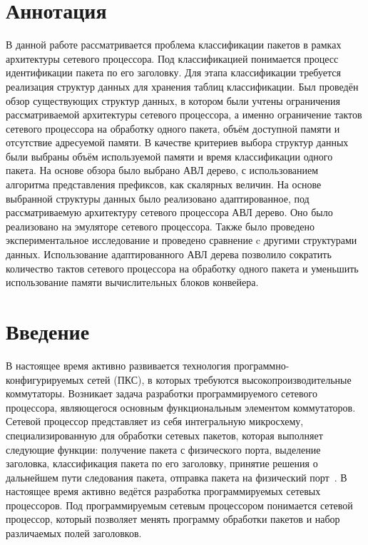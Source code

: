 \documentclass[a4paper, 12pt, titlepage, finall]{extreport}
\begin{document}
    \chapter*{Аннотация}
        В данной работе рассматривается проблема классификации пакетов в рамках архитектуры сетевого процессора. Под классификацией понимается процесс идентификации пакета по его заголовку.
        Для этапа классификации требуется реализация структур данных для хранения таблиц классификации.
        Был проведён обзор существующих структур данных, в котором были учтены ограничения рассматриваемой архитектуры сетевого процессора, а именно
        ограничение тактов сетевого процессора на обработку одного пакета, объём доступной памяти и отсутствие адресуемой памяти.
        В качестве критериев выбора структур данных были выбраны объём используемой памяти и время классификации одного пакета.
        На основе обзора было выбрано АВЛ дерево, с использованием алгоритма представления префиксов, как скалярных величин. На основе выбранной структуры данных было реализовано
        адаптированное, под рассматриваемую архитектуру сетевого процессора АВЛ дерево. Оно было реализовано на эмуляторе сетевого процессора.
        Также было проведено экспериментальное исследование и проведено сравнение c другими структурами данных. Использование адаптированного АВЛ дерева позволило 
        сократить количество тактов сетевого процессора на обработку одного пакета и уменьшить использование памяти вычислительных блоков конвейера.
        
    \newpage
    \tableofcontents
    \newpage

    \chapter*{Введение}
        В настоящее время активно развивается технология программно-конфигурируемых сетей (ПКС), в которых требуются высокопроизводительные 
        коммутаторы. Возникает задача разработки программируемого сетевого процессора, являющегося основным функциональным элементом коммутаторов. Сетевой процессор 
        представляет из себя интегральную микросхему, специализированную для обработки сетевых пакетов, которая выполняет следующие функции:
        получение пакета с физического порта, выделение заголовка,
        классификация пакета по его заголовку, принятие решения о дальнейшем пути следования пакета, отправка пакета на физический порт~\cite{chao2007high:1}.
        В настоящее время активно ведётся разработка программируемых сетевых процессоров. Под программируемым сетевым процессором
        понимается сетевой процессор, который позволяет менять программу обработки пакетов и набор различаемых полей заголовков.
        
\end{document}
